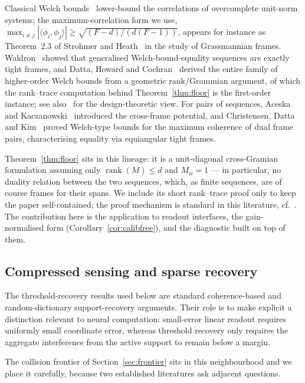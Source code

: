 \documentclass[preprint,12pt]{elsarticle}
\theoremstyle{definition}
\begin{document}
Classical Welch bounds~\cite{welch1974lower} lower-bound the correlations of overcomplete
unit-norm systems; the maximum-correlation form we use,
$\max_{i\neq j}|\langle\phi_i,\phi_j\rangle|\ge\sqrt{(F-d)/(d(F-1))}$, appears for instance as
Theorem~2.3 of Strohmer and Heath~\cite{strohmer2003grassmannian} in the study of Grassmannian
frames. Waldron~\cite{waldron2003generalized} showed that generalised Welch-bound-equality
sequences are exactly tight frames, and Datta, Howard and Cochran~\cite{datta2012geometry}
derived the entire family of higher-order Welch bounds from a geometric rank/Grammian
argument, of which the rank--trace computation behind Theorem~\ref{thm:floor} is the
first-order instance; see also~\cite{klappenecker2005mub} for the design-theoretic view. For
pairs of sequences, Aceska and Kaczanowski~\cite{aceska2022crossframe} introduced the
cross-frame potential, and Christensen, Datta and Kim~\cite{christensen2020welch} proved
Welch-type bounds for the maximum coherence of dual frame pairs, characterising equality via
equiangular tight frames.

Theorem~\ref{thm:floor} sits in this lineage: it is a unit-diagonal cross-Gramian formulation
assuming only $\operatorname{rank}(M)\le d$ and $M_{ii}=1$ --- in particular, no duality
relation between the two sequences, which, as finite sequences, are of course frames for their
spans. We include its short rank--trace proof only to keep the paper self-contained; the proof
mechanism is standard in this literature, cf.~\cite{datta2012geometry}. The contribution here
is the application to readout interfaces, the gain-normalised form
(Corollary~\ref{cor:calibfree}), and the diagnostic built on top of them.

\subsection{Compressed sensing and sparse recovery}

The threshold-recovery results used below are standard coherence-based and random-dictionary
support-recovery arguments. Their role is to make explicit a distinction relevant to neural
computation: small-error linear readout requires uniformly small coordinate error, whereas
threshold recovery only requires the aggregate interference from the active support to remain
below a margin.

The collision frontier of Section~\ref{sec:frontier} sits in this neighbourhood and we place it
carefully, because two established literatures ask adjacent questions.
\end{document}
